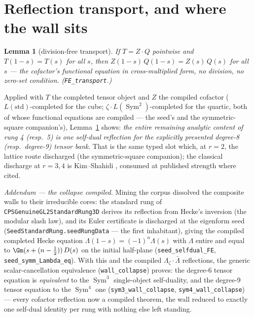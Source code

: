 \documentclass[11pt]{article}
\newtheorem{lemma}[theorem]{Lemma}
\newcommand{\Sym}{\operatorname{Sym}}
\begin{document}
\section{Reflection transport, and where the wall sits}

\begin{lemma}[division-free transport]\label{lem:transport}
If $T=Z\cdot Q$ pointwise and $T(1-s)=T(s)$ for all $s$, then
$Z(1-s)\,Q(1-s)=Z(s)\,Q(s)$ for all $s$ --- the cofactor's functional equation in
cross-multiplied form, no division, no zero-set condition.  (\texttt{FE\_transport}.)
\end{lemma}

Applied with $T$ the completed tensor object and $Z$ the compiled cofactor
($L(\mathrm{std})$-completed for the cube; $\zeta\cdot L(\Sym^2)$-completed for the
quartic, both of whose functional equations are compiled --- the seed's and the
symmetric-square companion's), Lemma~\ref{lem:transport} shows: \emph{the entire
remaining analytic content of rung 4 (resp.\ 5) is one self-dual reflection for the
explicitly presented degree-8 (resp.\ degree-9) tensor bank}.  That is the same typed
slot which, at $r=2$, the lattice route discharged (the symmetric-square companion); the
classical discharge at $r=3,4$ is Kim--Shahidi \cite{KimShahidi}, consumed at published
strength where cited.

\emph{Addendum --- the collapse compiled.}  Mining the corpus dissolved the composite
walls to their irreducible cores: the standard rung of
\texttt{CPSGenuineGL2StandardRung3D} derives its reflection from Hecke's inversion (the
modular slash law), and its Euler certificate is discharged at the eigenform seed
(\texttt{SeedStandardRung.seedRungData} --- the first inhabitant), giving the compiled
completed Hecke equation $\Lambda(1-s)=(-1)^n\Lambda(s)$ with $\Lambda$ entire and equal
to $\Gm(s+(n-\tfrac12))\,D(s)$ on the initial half-plane
(\texttt{seed\_selfdual\_FE}, \texttt{seed\_symm\_Lambda\_eq}).  With this and the
compiled $\Lambda_\zeta\cdot\bar\Lambda$ reflections, the generic scalar-cancellation
equivalence (\texttt{wall\_collapse}) proves: the degree-6 tensor equation is
\emph{equivalent} to the $\Sym^3$ single-object self-duality, and the degree-9 tensor
equation to the $\Sym^4$ one (\texttt{sym3\_wall\_collapse},
\texttt{sym4\_wall\_collapse}) --- every cofactor reflection now a compiled theorem, the
wall reduced to exactly one self-dual identity per rung with nothing else left standing.
\end{document}

